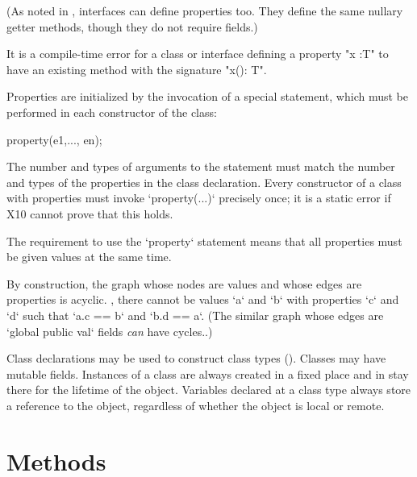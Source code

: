 \noindent (As noted in , interfaces can define
properties too. They define the same nullary getter methods, though they do
not require fields.)


\begin{staticrule*}
It is a compile-time error for a class or
interface defining a property \xcd"x :T" to have an existing method with
the signature \xcd"x(): T".
\end{staticrule*}


Properties are initialized by the invocation of a special 
statement, which must be performed in each constructor of the class:
\begin{xten}
property(e1,..., en);
\end{xten}
The number and types of arguments to the  statement must match
the number and types of the properties in the class declaration.  
Every constructor of a class with properties must invoke \xcd`property(...)`
precisely once; it is a static error if X10 cannot prove that this holds.

The requirement to use the \xcd`property` statement means that all properties
must be given values at the same time.  

By construction, the graph whose nodes are values and whose edges are
properties is acyclic.  \Eg, there cannot be values \xcd`a` and \xcd`b` with
properties \xcd`c` and \xcd`d` such that \xcd`a.c == b` and \xcd`b.d == a`.
(The similar graph whose edges are \xcd`global public val` fields {\em can} have
cycles..) 


\label{PropertyCall}







\label{ReferenceClasses}

Class declarations may
be used to construct class types (). Classes may
have mutable fields. Instances of a class are always created in a
fixed place and in \XtenCurrVer{} stay there for the lifetime of the
object.  Variables declared at a class type always store a reference
to the object, regardless of whether the object is local or remote.


\section{Methods}

